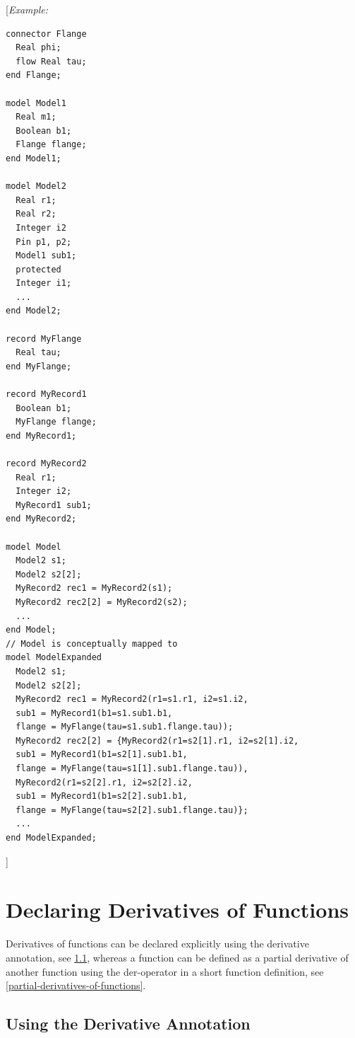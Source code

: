 \documentclass[10pt,a4paper]{report}
\def\doublelabel#1{\label{#1}}
\begin{document}
{[}\emph{Example:}

\begin{lstlisting}[language=modelica]
connector Flange
  Real phi;
  flow Real tau;
end Flange;

model Model1
  Real m1;
  Boolean b1;
  Flange flange;
end Model1;

model Model2
  Real r1;
  Real r2;
  Integer i2
  Pin p1, p2;
  Model1 sub1;
  protected
  Integer i1;
  ...
end Model2;

record MyFlange
  Real tau;
end MyFlange;

record MyRecord1
  Boolean b1;
  MyFlange flange;
end MyRecord1;

record MyRecord2
  Real r1;
  Integer i2;
  MyRecord1 sub1;
end MyRecord2;

model Model
  Model2 s1;
  Model2 s2[2];
  MyRecord2 rec1 = MyRecord2(s1);
  MyRecord2 rec2[2] = MyRecord2(s2);
  ...
end Model;
// Model is conceptually mapped to
model ModelExpanded
  Model2 s1;
  Model2 s2[2];
  MyRecord2 rec1 = MyRecord2(r1=s1.r1, i2=s1.i2,
  sub1 = MyRecord1(b1=s1.sub1.b1,
  flange = MyFlange(tau=s1.sub1.flange.tau));
  MyRecord2 rec2[2] = {MyRecord2(r1=s2[1].r1, i2=s2[1].i2,
  sub1 = MyRecord1(b1=s2[1].sub1.b1,
  flange = MyFlange(tau=s1[1].sub1.flange.tau)),
  MyRecord2(r1=s2[2].r1, i2=s2[2].i2,
  sub1 = MyRecord1(b1=s2[2].sub1.b1,
  flange = MyFlange(tau=s2[2].sub1.flange.tau)};
  ...
end ModelExpanded;
\end{lstlisting}
{]}

\section{Declaring Derivatives of Functions}\doublelabel{declaring-derivatives-of-functions}

Derivatives of functions can be declared explicitly using the derivative
annotation, see \ref{using-the-derivative-annotation}, whereas a function can be defined as a
partial derivative of another function using the der-operator in a short
function definition, see \ref{partial-derivatives-of-functions}.

\subsection{Using the Derivative Annotation}\doublelabel{using-the-derivative-annotation}
\end{document}
